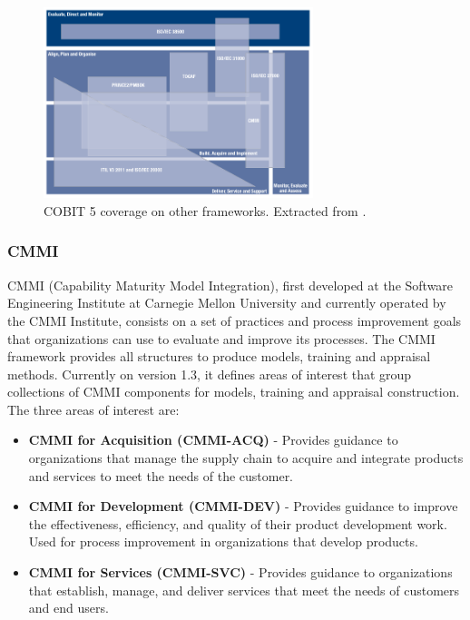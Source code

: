 \begin{figure}[h!]
\centering
\includegraphics[width=0.7\textwidth]{img/COBITOtherFrameworks.png}
\caption{COBIT 5 coverage on other frameworks. Extracted from \cite{2012cobit}.}
\end{figure}


\subsubsection{CMMI}


CMMI (Capability Maturity Model Integration), first developed at the Software Engineering Institute at Carnegie Mellon University and currently operated by the CMMI Institute, consists on a set of practices and process improvement goals that organizations can use to evaluate and improve its processes. The CMMI framework provides all structures to produce models, training and appraisal methods.
Currently on version 1.3, it defines areas of interest that group collections of CMMI components for models, training and appraisal construction. The three areas of interest are:

\begin{itemize}

\item \textbf{CMMI for Acquisition (CMMI-ACQ)\cite{cmmiAcquisition}} - Provides guidance to organizations that manage the supply chain to acquire and integrate products and services to meet the needs of the customer.

\item \textbf{CMMI for Development (CMMI-DEV)\cite{cmmi}} - Provides guidance to improve the effectiveness, efficiency, and quality of their product development work. Used for process improvement in organizations that develop products.

\item \textbf{CMMI for Services (CMMI-SVC)\cite{cmmiServices}} - Provides guidance to organizations that establish, manage, and deliver services that meet the needs of customers and end users.

\end{itemize}

